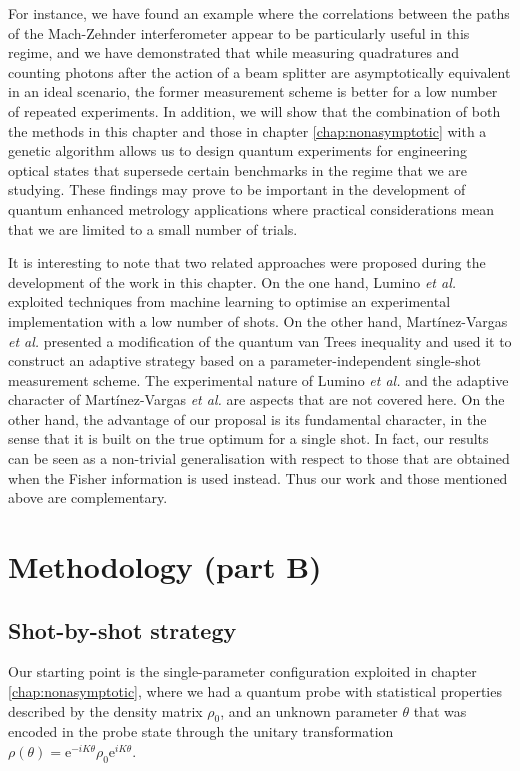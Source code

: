 For instance, we have found an example where the correlations between the paths of the Mach-Zehnder interferometer appear to be particularly useful in this regime, and we have demonstrated that while measuring quadratures and counting photons after the action of a beam splitter are asymptotically equivalent in an ideal scenario, the former measurement scheme is better for a low number of repeated experiments. In addition, we will show that the combination of both the methods in this chapter and those in chapter \ref{chap:nonasymptotic} with a genetic algorithm allows us to design quantum experiments for engineering optical states that supersede certain benchmarks in the regime that we are studying. These findings may prove to be important in the development of quantum enhanced metrology applications where practical considerations mean that we are limited to a small number of trials.

It is interesting to note that two related approaches were proposed during the development of the work in this chapter. On the one hand, Lumino \emph{et al.} \cite{lumino2017} exploited techniques from machine learning to optimise an experimental implementation with a low number of shots. On the other hand, Mart\'{i}nez-Vargas \emph{et al.} \cite{esteban2017} presented a modification of the quantum van Trees inequality and used it to construct an adaptive strategy based on a parameter-independent single-shot measurement scheme. The experimental nature of Lumino \emph{et al.} \cite{lumino2017} and the adaptive character of Mart\'{i}nez-Vargas \emph{et al.} \cite{esteban2017} are aspects that are not covered here. On the other hand, the advantage of our proposal is its fundamental character, in the sense that it is built on the true optimum for a single shot. In fact, our results can be seen as a non-trivial generalisation with respect to those that are obtained when the Fisher information is used instead. Thus our work and those mentioned above are complementary.

\section{Methodology (part B)}\label{sec:methodb}

\subsection{Shot-by-shot strategy}
\label{subsec:shotbyshot}

Our starting point is the single-parameter configuration exploited in chapter \ref{chap:nonasymptotic}, where we had a quantum probe with statistical properties described by the density matrix $\rho_0$, and an unknown parameter $\theta$ that was encoded in the probe state through the unitary transformation $\rho(\theta) = \mathrm{e}^{-i K\theta}\rho_0 \mathrm{e}^{i K\theta}$. 

